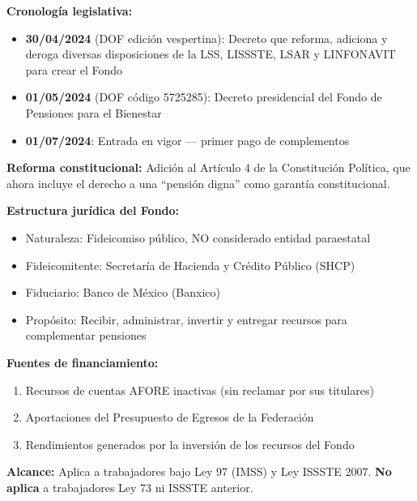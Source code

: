 \documentclass[11pt,a4paper]{report}
\begin{document}
\begin{tcolorbox}[colback=blue!5!white, colframe=blue!75!black, title=\textbf{Definici\'on Formal}]
\textbf{Cronolog\'ia legislativa:}
\begin{itemize}[nosep]
\item \textbf{30/04/2024} (DOF edici\'on vespertina): Decreto que reforma, adiciona y deroga diversas disposiciones de la LSS, LISSSTE, LSAR y LINFONAVIT para crear el Fondo
\item \textbf{01/05/2024} (DOF c\'odigo 5725285): Decreto presidencial del Fondo de Pensiones para el Bienestar
\item \textbf{01/07/2024}: Entrada en vigor --- primer pago de complementos
\end{itemize}

\textbf{Reforma constitucional:} Adici\'on al Art\'iculo 4 de la Constituci\'on Pol\'itica, que ahora incluye el derecho a una ``pensi\'on digna'' como garant\'ia constitucional.

\textbf{Estructura jur\'idica del Fondo:}
\begin{itemize}[nosep]
\item Naturaleza: Fideicomiso p\'ublico, NO considerado entidad paraestatal
\item Fideicomitente: Secretar\'ia de Hacienda y Cr\'edito P\'ublico (SHCP)
\item Fiduciario: Banco de M\'exico (Banxico)
\item Prop\'osito: Recibir, administrar, invertir y entregar recursos para complementar pensiones
\end{itemize}

\textbf{Fuentes de financiamiento:}
\begin{enumerate}[nosep]
\item Recursos de cuentas AFORE inactivas (sin reclamar por sus titulares)
\item Aportaciones del Presupuesto de Egresos de la Federaci\'on
\item Rendimientos generados por la inversi\'on de los recursos del Fondo
\end{enumerate}

\textbf{Alcance:} Aplica a trabajadores bajo Ley 97 (IMSS) y Ley ISSSTE 2007. \textbf{No aplica} a trabajadores Ley 73 ni ISSSTE anterior.
\end{tcolorbox}
\end{document}
